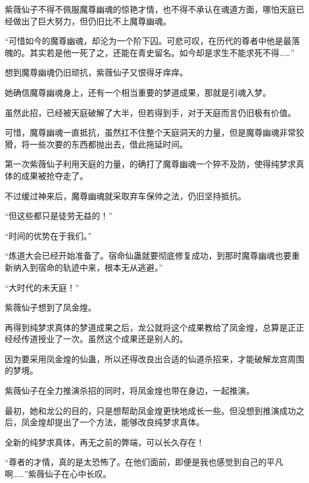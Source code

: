 \begin{this_body}
紫薇仙子不得不佩服魔尊幽魂的惊艳才情，也不得不承认在魂道方面，哪怕天庭已经做出了巨大努力，但仍旧比不上魔尊幽魂。

“可惜如今的魔尊幽魂，却沦为一个阶下囚。可悲可叹，在历代的尊者中他是最落魄的。其实若是他一死了之，还能在青史留名。如今却是求生不能求死不得……”

想到魔尊幽魂仍旧顽抗，紫薇仙子又恨得牙痒痒。

她确信魔尊幽魂身上，还有一个相当重要的梦道成果，那就是引魂入梦。

虽然此招，已经被天庭破解了大半，但若得到手，对于天庭而言仍旧极有价值。

可惜，魔尊幽魂一直抵抗，虽然扛不住整个天庭洞天的力量，但是魔尊幽魂非常狡猾，将一些次要的东西都抛出去，借此拖延时间。

第一次紫薇仙子利用天庭的力量，的确打了魔尊幽魂一个猝不及防，使得纯梦求真体的成果被抢夺走了。

不过缓过神来后，魔尊幽魂就采取弃车保帅之法，仍旧坚持抵抗。

“但这些都只是徒劳无益的！”

“时间的优势在于我们。”

“炼道大会已经开始准备了。宿命仙蛊就要彻底修复成功，到那时魔尊幽魂也要重新纳入到宿命的轨迹中来，根本无从逃避。”

“大时代的未天庭！”

紫薇仙子想到了凤金煌。

再得到纯梦求真体的梦道成果之后，龙公就将这个成果教给了凤金煌，总算是正正经经传道授业了一次。虽然这个成果还是别人的。

因为要采用凤金煌的仙蛊，所以还得改良出合适的仙道杀招来，才能破解龙宫周围的梦境。

紫薇仙子在全力推演杀招的同时，将凤金煌也带在身边，一起推演。

最初，她和龙公的目的，只是想帮助凤金煌更快地成长一些。但没想到推演成功之后，凤金煌却提出了一个方法，能够改良纯梦求真体。

全新的纯梦求真体，再无之前的弊端，可以长久存在！

“尊者的才情，真的是太恐怖了。在他们面前，即便是我也感觉到自己的平凡啊……”紫薇仙子在心中长叹。

\end{this_body}

